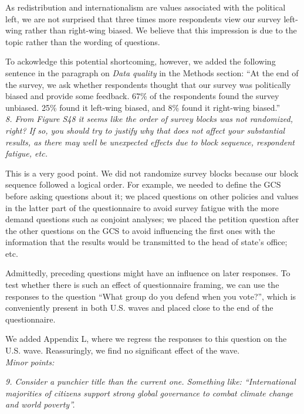 \documentclass[12pt,english]{article}
\begin{document}
As redistribution and internationalism are values associated with the political left, we are not surprised that three times more respondents view our survey left-wing rather than right-wing biased. We believe that this impression is due to the topic rather than the wording of questions. 

To ackowledge this potential shortcoming, however, we added the following sentence in the paragraph on \textit{Data quality} in the Methods section: ``At the end of the survey, we ask whether respondents thought that our survey was politically biased and provide some feedback. 67\% of the respondents found the survey unbiased. 25\% found it left-wing biased, and 8\% found it right-wing biased.''
~\\

\textit{8. From Figure S48 it seems like the order of survey blocks was not randomized, right? If so, you should try to justify why that does not affect your substantial results, as there may well be unexpected effects due to block sequence, respondent fatigue, etc.}

This is a very good point. We did not randomize survey blocks because our block sequence followed a logical order. For example, we needed to define the GCS before asking questions about it; we placed questions on other policies and values in the latter part of the questionnaire to avoid survey fatigue with the more demand questions such as conjoint analyses; we placed the petition question after the other questions on the GCS to avoid influencing the first ones with the information that the results would be transmitted to the head of state's office; etc. 

Admittedly, preceding questions might have an influence on later responses. To test whether there is such an effect of questionnaire framing, we can use the responses to the question ``What group do you defend when you vote?'', which is conveniently present in both U.S. waves and placed close to the end of the questionnaire. 

We added Appendix L, where we regress the responses to this question on the U.S. wave. Reassuringly, we find no significant effect of the wave.
~\\

\textit{Minor points:}

\textit{9. Consider a punchier title than the current one. Something like: “International majorities of citizens support strong global governance to combat climate change and world poverty”.}
\end{document}
